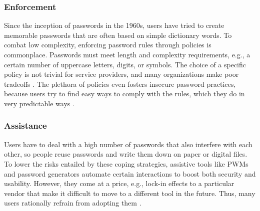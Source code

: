 \subsubsection{Enforcement}
Since the inception of passwords in the 1960s, users have tried to create memorable passwords that are often based on simple dictionary words. To combat low complexity, enforcing password rules through policies is commonplace. Passwords must meet length and complexity requirements, e.g., a certain number of uppercase letters, digits, or symbols. The choice of a specific policy is not trivial for service providers, and many organizations make poor tradeoffs \cite{Florencio2010WhereDoPoliciesComeFrom, Shay2016DesigningPasswordPolicies}. The plethora of policies even fosters insecure password practices, because users try to find easy ways to comply with the rules, which they do in very predictable ways \cite{Inglesant2010TrueCostOfUnusablePolicies, Komanduri2011OfPasswordsAndPeople, Ur2015PWCreationLab}. 

\subsubsection{Assistance}
Users have to deal with a high number of passwords that also interfere with each other, so people reuse passwords and write them down on paper or digital files. To lower the risks entailed by these coping strategies, assistive tools like \glspl{PWM} and password generators automate certain interactions to boost both security and usability. However, they come at a price, e.g., lock-in effects to a particular vendor that make it difficult to move to a different tool in the future. Thus, many users rationally refrain from adopting them \cite{CSID2012PasswordHabits}. 

